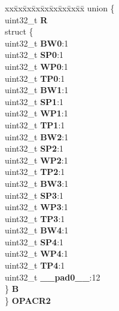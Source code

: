 \begin{DoxyCompactItemize}
\begin{tabbing}
\end{tabbing}\item 
\mbox{\label{structPBRIDGE__B__tag_af9b1889b7e20ad82c40f16753b554c0e}} 
\begin{tabbing}
xx\=xx\=xx\=xx\=xx\=xx\=xx\=xx\=xx\=\kill
union \{\\
\>uint32\_t {\bfseries R}\\
\>struct \{\\
\>\>uint32\_t {\bfseries BW0}:1\\
\>\>uint32\_t {\bfseries SP0}:1\\
\>\>uint32\_t {\bfseries WP0}:1\\
\>\>uint32\_t {\bfseries TP0}:1\\
\>\>uint32\_t {\bfseries BW1}:1\\
\>\>uint32\_t {\bfseries SP1}:1\\
\>\>uint32\_t {\bfseries WP1}:1\\
\>\>uint32\_t {\bfseries TP1}:1\\
\>\>uint32\_t {\bfseries BW2}:1\\
\>\>uint32\_t {\bfseries SP2}:1\\
\>\>uint32\_t {\bfseries WP2}:1\\
\>\>uint32\_t {\bfseries TP2}:1\\
\>\>uint32\_t {\bfseries BW3}:1\\
\>\>uint32\_t {\bfseries SP3}:1\\
\>\>uint32\_t {\bfseries WP3}:1\\
\>\>uint32\_t {\bfseries TP3}:1\\
\>\>uint32\_t {\bfseries BW4}:1\\
\>\>uint32\_t {\bfseries SP4}:1\\
\>\>uint32\_t {\bfseries WP4}:1\\
\>\>uint32\_t {\bfseries TP4}:1\\
\>\>uint32\_t {\bfseries \_\_pad0\_\_}:12\\
\>\} {\bfseries B}\\
\} {\bfseries OPACR2}\\


\end{tabbing}
\end{DoxyCompactItemize}
